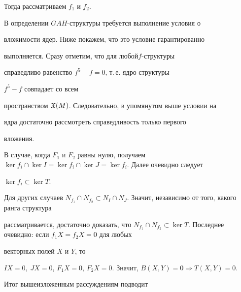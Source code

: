 Тогда рассматриваем $f_1$ и $f_2$.





В определении $GAH$-структуры требуется выполнение условия о


вложимости ядер. Ниже покажем, что это условие гарантированно


выполняется. Сразу отметим, что для любой\linebreak $f$-структуры 


справедливо равенство $f^5-f=0$, т.\,е. ядро структуры


$f^5-f$ совпадает со всем


пространством $\frak{X}(M)$. Следовательно, в упомянутом выше условии на


ядра достаточно рассмотреть справедливость только первого


вложения.





В случае, когда $F_1$ и $F_2$ равны нулю, получаем $\ker f_i\cap


\ker I=\ker f_i\cap \ker J=\ker f_i$. Далее очевидно следует


$\ker f_i\subset \ker T$.





Для других случаев $N_{f_1}\cap N_{f_2}\subset


N_I\cap N_J$. Значит, независимо от того, какого ранга структура


рассматривается, достаточно доказать, что $N_{f_1}\cap


N_{f_2}\subset \ker T$. Последнее очевидно: если $f_1X=f_2X=0$ для любых


векторных полей $X$ и $Y$, то


$IX=0,\;JX=0$, $F_1X=0$, $F_2X=0$. Значит, $B(X,Y)=0\Rightarrow


T(X,Y)=0$.





Итог вышеизложенным рассуждениям подводит





